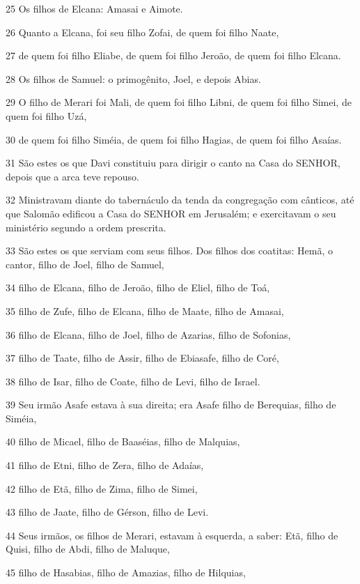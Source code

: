 \par 25 Os filhos de Elcana: Amasai e Aimote.
\par 26 Quanto a Elcana, foi seu filho Zofai, de quem foi filho Naate,
\par 27 de quem foi filho Eliabe, de quem foi filho Jeroão, de quem foi filho Elcana.
\par 28 Os filhos de Samuel: o primogênito, Joel, e depois Abias.
\par 29 O filho de Merari foi Mali, de quem foi filho Libni, de quem foi filho Simei, de quem foi filho Uzá,
\par 30 de quem foi filho Siméia, de quem foi filho Hagias, de quem foi filho Asaías.
\par 31 São estes os que Davi constituiu para dirigir o canto na Casa do SENHOR, depois que a arca teve repouso.
\par 32 Ministravam diante do tabernáculo da tenda da congregação com cânticos, até que Salomão edificou a Casa do SENHOR em Jerusalém; e exercitavam o seu ministério segundo a ordem prescrita.
\par 33 São estes os que serviam com seus filhos. Dos filhos dos coatitas: Hemã, o cantor, filho de Joel, filho de Samuel,
\par 34 filho de Elcana, filho de Jeroão, filho de Eliel, filho de Toá,
\par 35 filho de Zufe, filho de Elcana, filho de Maate, filho de Amasai,
\par 36 filho de Elcana, filho de Joel, filho de Azarias, filho de Sofonias,
\par 37 filho de Taate, filho de Assir, filho de Ebiasafe, filho de Coré,
\par 38 filho de Isar, filho de Coate, filho de Levi, filho de Israel.
\par 39 Seu irmão Asafe estava à sua direita; era Asafe filho de Berequias, filho de Siméia,
\par 40 filho de Micael, filho de Baaséias, filho de Malquias,
\par 41 filho de Etni, filho de Zera, filho de Adaías,
\par 42 filho de Etã, filho de Zima, filho de Simei,
\par 43 filho de Jaate, filho de Gérson, filho de Levi.
\par 44 Seus irmãos, os filhos de Merari, estavam à esquerda, a saber: Etã, filho de Quisi, filho de Abdi, filho de Maluque,
\par 45 filho de Hasabias, filho de Amazias, filho de Hilquias,
